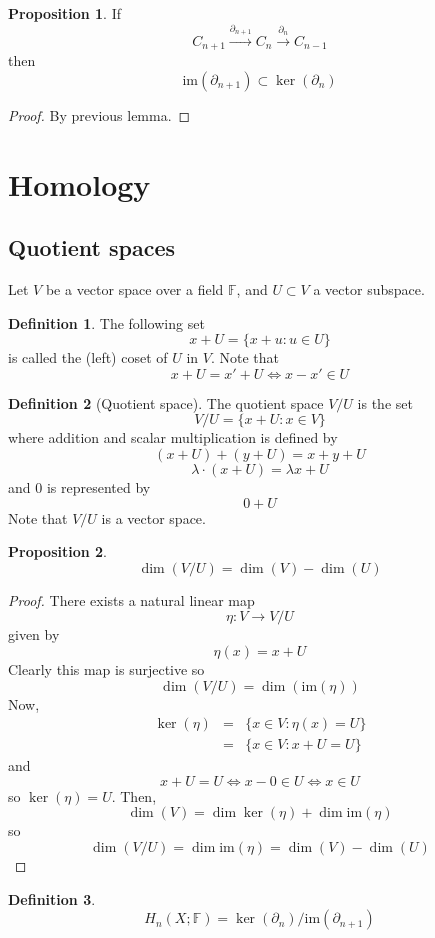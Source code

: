 \documentclass[a4paper,14pt]{extarticle}
\theoremstyle{definition}
\newtheorem*{definition}{Definition}
\newtheorem*{proposition}{Proposition}
\begin{document}
\begin{proposition}
	If \[C_{n+1}\xrightarrow{\partial_{n+1}}C_n\xrightarrow{\partial_n}C_{n-1}\] then \[\text{im}(\partial_{n+1})\subset\ker(\partial_n)\]
\end{proposition}

\begin{proof} By previous lemma.
\end{proof}

\section{Homology}
\subsection{Quotient spaces}
Let $V$ be a vector space over a field $\mathbb{F}$, and $U\subset V$ a vector subspace.

\begin{definition}
The following set \[x+U=\{x+u:u\in U\}\] is called the (left) coset of $U$ in $V$. Note that \[x+U=x'+U\iff x-x'\in U\]	
\end{definition}

\begin{definition}[Quotient space]
	The quotient space $V/U$ is the set \[V/U=\{x+U:x\in V\}\] where addition and scalar multiplication is defined by \[(x+U)+(y+U)=x+y+U\]\[\lambda\cdot(x+U)=\lambda x+U\] and 0 is
	represented by \[0+U\] Note that $V/U$ is a vector space.
\end{definition}

\begin{proposition}
	\[\dim(V/U)=\dim(V)-\dim(U)\]
\end{proposition}

\begin{proof}
	There exists a natural linear map \[\eta:V\rightarrow V/U\] given by \[\eta(x)=x+U\] Clearly this map is surjective so \[\dim(V/U)=\dim(\text{im}(\eta))\] Now,
	\begin{eqnarray*}
		\ker(\eta)&=&\{x\in V:\eta(x)=U\}\\
			&=&\{x\in V:x+U=U\}
	\end{eqnarray*}
	and \[x+U=U\iff x-0\in U\iff x\in U\] so $\ker(\eta)=U$. Then, \[\dim(V)=\dim\ker(\eta)+\dim\text{im}(\eta)\] so \[\dim(V/U)=\dim\text{im}(\eta)=\dim(V)-\dim(U)\]
\end{proof}

\begin{definition}
	\[H_n(X;\mathbb{F})=\ker(\partial_n)/\text{im}(\partial_{n+1})\]
\end{definition}
\end{document}
